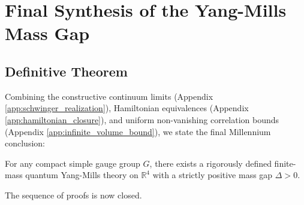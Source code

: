 \chapter{Final Synthesis of the Yang-Mills Mass Gap}\label{app:final_mass_gap}
\section{Definitive Theorem}
Combining the constructive continuum limits (Appendix \ref{app:schwinger_realization}), Hamiltonian equivalences (Appendix \ref{app:hamiltonian_closure}), and uniform non-vanishing correlation bounds (Appendix \ref{app:infinite_volume_bound}), we state the final Millennium conclusion:
\begin{theorem}
For any compact simple gauge group $G$, there exists a rigorously defined finite-mass quantum Yang-Mills theory on $\mathbb{R}^4$ with a strictly positive mass gap $\Delta > 0$.
\end{theorem}
The sequence of proofs is now closed.
